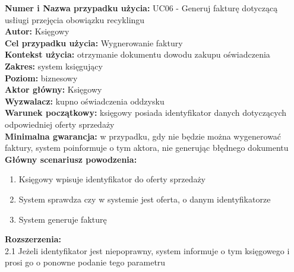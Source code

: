 \textbf{Numer i Nazwa przypadku użycia:} UC06 - Generuj fakturę dotyczącą usłiugi przejęcia obowiązku recyklingu \\
\textbf{Autor:} Księgowy\\
\textbf{Cel przypadku użycia:} Wygnerowanie faktury \\
\textbf{Kontekst użycia:} otrzymanie dokumentu dowodu zakupu oświadczenia  \\
\textbf{Zakres:} system księgujący \\
\textbf{Poziom:} biznesowy \\
\textbf{Aktor główny:} Księgowy \\
\textbf{Wyzwalacz:} kupno oświadczenia oddzysku \\
\textbf{Warunek początkowy:} księgowy posiada identyfikator danych dotyczących odpowiedniej oferty sprzedaży \\
\textbf{Minimalna gwarancja:} w przypadku, gdy nie będzie można wygenerować faktury, system poinformuje o tym aktora, nie generując błędnego dokumentu \\
\textbf{Główny scenariusz powodzenia:} 
	\begin{enumerate}
		\item Księgowy wpisuje identyfikator do oferty sprzedaży
		\item System sprawdza czy w systemie jest oferta, o danym identyfikatorze
		\item System generuje fakturę 
	\end{enumerate}
\textbf{Rozszerzenia:} \\
2.1 Jeżeli identyfikator jest niepoprawny, system informuje o tym księgowego i prosi go o ponowne podanie tego parametru


